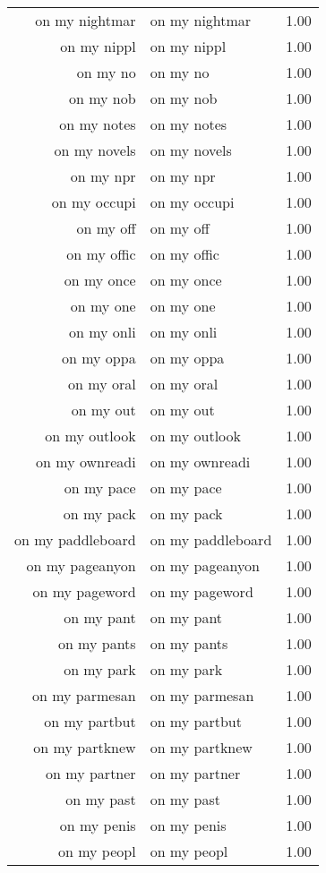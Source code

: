 \begin{table}[ht]
\begin{tabular}{rlr}
  on my nightmar & on my nightmar & 1.00 \\ 
  on my nippl & on my nippl & 1.00 \\ 
  on my no & on my no & 1.00 \\ 
  on my nob & on my nob & 1.00 \\ 
  on my notes & on my notes & 1.00 \\ 
  on my novels & on my novels & 1.00 \\ 
  on my npr & on my npr & 1.00 \\ 
  on my occupi & on my occupi & 1.00 \\ 
  on my off & on my off & 1.00 \\ 
  on my offic & on my offic & 1.00 \\ 
  on my once & on my once & 1.00 \\ 
  on my one & on my one & 1.00 \\ 
  on my onli & on my onli & 1.00 \\ 
  on my oppa & on my oppa & 1.00 \\ 
  on my oral & on my oral & 1.00 \\ 
  on my out & on my out & 1.00 \\ 
  on my outlook & on my outlook & 1.00 \\ 
  on my ownreadi & on my ownreadi & 1.00 \\ 
  on my pace & on my pace & 1.00 \\ 
  on my pack & on my pack & 1.00 \\ 
  on my paddleboard & on my paddleboard & 1.00 \\ 
  on my pageanyon & on my pageanyon & 1.00 \\ 
  on my pageword & on my pageword & 1.00 \\ 
  on my pant & on my pant & 1.00 \\ 
  on my pants & on my pants & 1.00 \\ 
  on my park & on my park & 1.00 \\ 
  on my parmesan & on my parmesan & 1.00 \\ 
  on my partbut & on my partbut & 1.00 \\ 
  on my partknew & on my partknew & 1.00 \\ 
  on my partner & on my partner & 1.00 \\ 
  on my past & on my past & 1.00 \\ 
  on my penis & on my penis & 1.00 \\ 
  on my peopl & on my peopl & 1.00 \\ 

\end{tabular}
\end{table}
